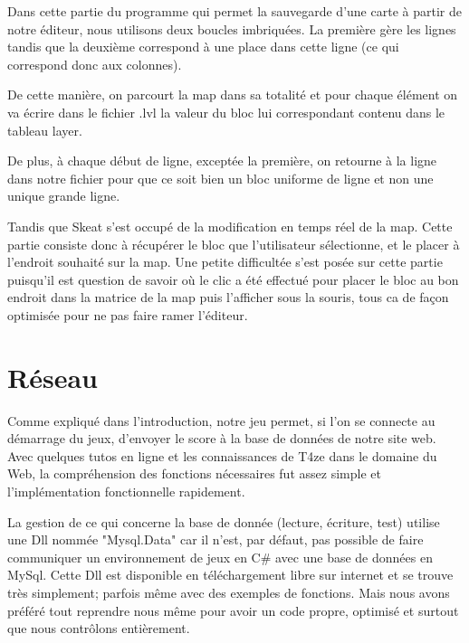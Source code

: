 \documentclass [11pt]{report}
\begin{document}
		
		\vspace{10mm}
		
		
		
		Dans cette partie du programme qui permet la sauvegarde d'une carte à partir de  notre éditeur, nous utilisons deux boucles imbriquées. La première gère les lignes tandis que la deuxième correspond à une place dans cette ligne (ce qui correspond donc aux colonnes).
		
		De cette manière, on parcourt la map dans sa totalité et pour chaque élément on va écrire dans le fichier .lvl la valeur du bloc lui correspondant contenu dans le tableau layer. 
		
		De plus, à chaque début de ligne, exceptée la première, on retourne à la ligne dans notre fichier pour que ce soit bien un bloc uniforme de ligne et non une unique grande ligne.\\
		
		\vspace{10mm}
		
		
		Tandis que Skeat s'est occupé de la modification en temps réel de la map. Cette partie consiste donc à récupérer le bloc que l'utilisateur sélectionne, et le placer à l'endroit souhaité sur la map. Une petite difficultée s'est posée sur cette partie puisqu'il est question de savoir où le clic a été effectué pour placer le bloc au bon endroit dans la matrice de la map puis l'afficher sous la souris, tous ca de façon optimisée pour ne pas faire ramer l'éditeur.\\
			 
			
	
	
	\newpage
	
	\section{Réseau}
	Comme expliqué dans l'introduction, notre jeu permet, si l'on se connecte au démarrage du jeux, d'envoyer le score à la base de données de notre site web.\\
	
	Avec quelques tutos en ligne et les connaissances de T4ze dans le domaine du Web, la compréhension des fonctions nécessaires fut assez simple et l'implémentation fonctionnelle rapidement.
	
	La gestion de ce qui concerne la base de donnée (lecture, écriture, test) utilise une Dll nommée "Mysql.Data" car il n'est, par défaut, pas possible de faire communiquer un environnement de jeux en C\# avec une base de données en MySql. Cette Dll est disponible en téléchargement libre sur internet et se trouve très simplement; parfois même avec des exemples de fonctions. Mais nous avons préféré tout reprendre nous même pour avoir un code propre, optimisé et surtout que nous contrôlons entièrement.
	
\end{document}
